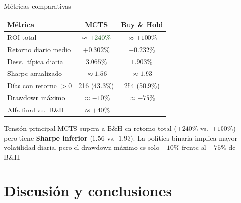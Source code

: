 \documentclass[aspectratio=169, 10pt]{beamer}
\begin{document}
\begin{frame}{Métricas comparativas}
  \begin{center}
  \renewcommand{\arraystretch}{1.3}
  \begin{tabular}{lcc}
    \toprule
    \textbf{Métrica} & \textbf{MCTS} & \textbf{Buy \& Hold} \\
    \midrule
    ROI total             & $\approx \textcolor{mctsDkGreen}{+240\%}$ & \textcolor{mctsRed!80}{$\approx +100\%$} \\
    Retorno diario medio  & $+0.302\%$       & $+0.232\%$ \\
    Desv.\ típica diaria  & $3.065\%$        & $1.903\%$ \\
    Sharpe anualizado     & $\approx 1.56$   & $\approx 1.93$ \\
    Días con retorno $>0$ & 216 (43.3\%)     & 254 (50.9\%) \\
    Drawdown máximo       & $\approx -10\%$  & $\approx -75\%$ \\
    Alfa final vs.\ B\&H  & $\approx +40\%$  & — \\
    \bottomrule
  \end{tabular}
  \end{center}

  \vspace{0.3cm}
  \begin{alertblock}{Tensión principal}
    MCTS supera a B\&H en retorno total ($+240\%$ vs.\ $+100\%$)
    pero tiene \textbf{Sharpe inferior} ($1.56$ vs.\ $1.93$).
    La política binaria implica mayor volatilidad diaria,
    pero el drawdown máximo es solo $-10\%$ frente al $-75\%$ de B\&H.
  \end{alertblock}
\end{frame}

\section{Discusión y conclusiones}
\end{document}
